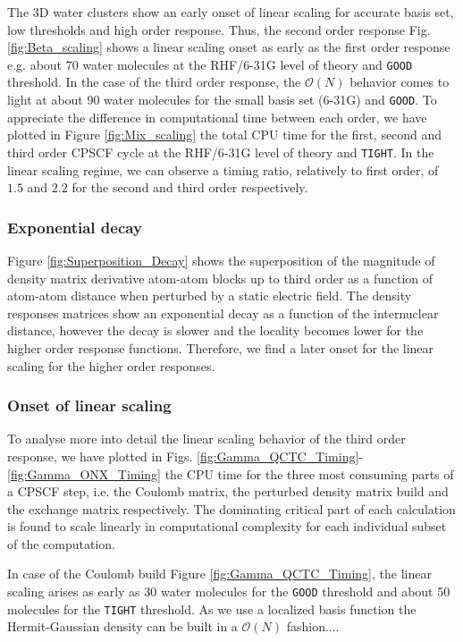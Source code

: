\documentclass[prl,aps,letterpaper,twocolumn,showpacs,twocolumngrid,superbib]{revtex4}
\begin{document}
The 3D water clusters show an early onset of linear scaling for accurate
basis set, low thresholds and high order response.
Thus, the second order response Fig. \ref{fig:Beta_scaling} shows a linear scaling
onset as early as the first order response e.g. about 70 water molecules at
the RHF/6-31G level of theory and {\tt GOOD} threshold. In the case of the third order
response, the $\mathcal{O}(N)$ behavior comes to light at about 90 water 
molecules for the small basis set (6-31G) and {\tt GOOD}. 
To appreciate the difference in computational time between each order,
we have plotted in Figure \ref{fig:Mix_scaling} the total CPU time for the
first, second and third order CPSCF cycle at the RHF/6-31G level of theory and {\tt TIGHT}. 
In the linear scaling regime, we can observe a timing ratio, relatively to first order, 
of $1.5$ and $2.2$ for the second and third order respectively.

\subsubsection{Exponential decay}
Figure \ref{fig:Superposition_Decay} shows the superposition 
of the magnitude of density matrix derivative atom-atom blocks up to 
third order as a function of atom-atom distance when perturbed by 
a static electric field. 
The density responses matrices show an exponential decay as a function
of the internuclear distance, however the decay is slower and the locality
becomes lower for the higher order response functions.
Therefore, we find a later onset for the linear scaling for the higher order
responses. 


\subsubsection{Onset of linear scaling}

To analyse more into detail the linear scaling behavior of the third order
response, we have plotted in Figs. \ref{fig:Gamma_QCTC_Timing}-\ref{fig:Gamma_ONX_Timing} 
the CPU time for the three most consuming parts of a CPSCF step, i.e. the Coulomb matrix, 
the perturbed density matrix build and the exchange matrix respectively. 
The dominating critical part of each calculation is found to scale linearly
in computational complexity for each individual subset of the computation. 

In case of the Coulomb build Figure \ref{fig:Gamma_QCTC_Timing}, 
the linear scaling arises as early as 30 water molecules for the 
{\tt GOOD} threshold and about 50 molecules for the
{\tt TIGHT} threshold. As we use a localized basis function the 
Hermit-Gaussian density can be built in a $\mathcal{O}(N)$ fashion....
\end{document}
